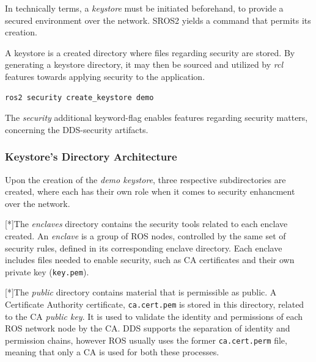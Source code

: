 In technically terms, a \textit{keystore} must be initiated beforehand, to provide a secured environment over the network. SROS2 yields a command that permits its creation. 

A keystore is a created directory where files regarding security are stored. By generating a keystore directory, it may then be sourced and utilized by \textit{rcl} features towards applying security to the application.
            
\begin{lstlisting}[title={\textit{Keystore} creation using the proper SROS2 command.}]
ros2 security create_keystore demo
\end{lstlisting}

The \textit{security} additional keyword-flag enables features regarding security matters, concerning the DDS-security artifacts.

\subsubsection{Keystore's Directory Architecture}

Upon the creation of the \textit{demo keystore}, three respective subdirectories are created, where each has their own role when it comes to security enhancment over the network.

[*]The \textit{enclaves} directory contains the security tools related to each enclave created. An \textit{enclave} is a group of ROS nodes, controlled by the same set of security rules, defined in its corresponding enclave directory. Each enclave includes files needed to enable security, such as CA certificates and their own private key (\texttt{key.pem}). %

[*]The \textit{public} directory contains material that is permissible as public. A Certificate Authority certificate, \texttt{ca.cert.pem} is stored in this directory, related to the CA \textit{public key}. It is used to validate the identity and permissions of each ROS network node by the CA. DDS supports the separation of identity and permission chains, however ROS usually uses the former \texttt{ca.cert.perm} file, meaning that only a CA is used for both these processes.


